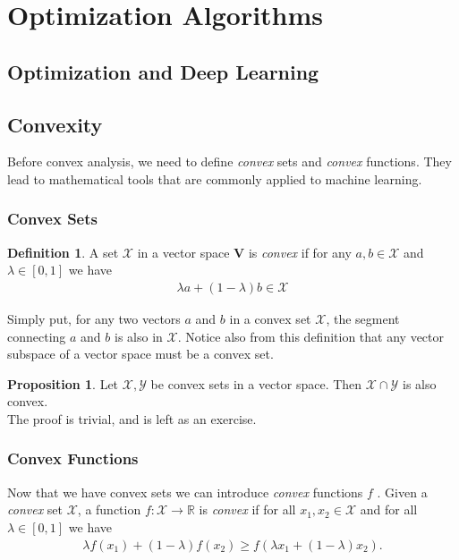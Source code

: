 \documentclass[a4paper,12pt]{article}
\theoremstyle{definition}
\newtheorem*{definition}{Definition}
\newtheorem*{proposition}{Proposition}
\begin{document}
\section{Optimization Algorithms}

\subsection{Optimization and Deep Learning}

\subsection{Convexity}
Before convex analysis, we need to define \emph{convex} sets and \emph{convex} functions. They lead to mathematical tools that are commonly applied to machine learning.

\subsubsection*{Convex Sets}
\begin{definition}
    A set $\mathcal{X}$ in a vector space $\mathbf{V}$ is \emph{convex} if for any $a,b \in \mathcal{X}$ and $\lambda \in [0, 1]$ we have
    \begin{equation*}
        \begin{aligned}
            \lambda  a + (1-\lambda)  b \in \mathcal{X}
        \end{aligned}
    \end{equation*}
\end{definition}

Simply put, for any two vectors $a$ and $b$ in a convex set $\mathcal{X}$, the segment connecting $a$ and $b$ is also in $\mathcal{X}$.
Notice also from this definition that any vector subspace of a vector space must be a convex set.

\begin{proposition}
    Let $\mathcal{X}, \mathcal{Y}$ be convex sets in a vector space. Then $\mathcal{X} \cap \mathcal{Y}$ is also convex.
    \\[6pt]
    The proof is trivial, and is left as an exercise.
\end{proposition}


\subsubsection*{Convex Functions}

Now that we have convex sets we can introduce \emph{convex} functions $f$ . Given a \emph{convex} set $\mathcal{X}$, a function $f: \mathcal{X} \to \mathbb{R}$ is \emph{convex} if for all
$x_1, x_2 \in \mathcal{X}$ and for all $\lambda \in [0, 1]$ we have
\begin{equation*}
    \begin{aligned}
        \lambda f(x_1) + (1-\lambda) f(x_2) \geq f(\lambda x_1 + (1-\lambda) x_2).
    \end{aligned}
\end{equation*}
\end{document}

